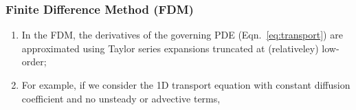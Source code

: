 \documentclass[10pt,compress,handout,ignorenonframetext]{beamer}
\begin{document}
\begin{frame}
 \frametitle{Finite Difference Method (FDM)} 

\begin{enumerate}
  \item <1-> In the FDM, the derivatives of the governing PDE (Eqn.~\ref{eq:transport}) are approximated using Taylor series expansions truncated at (relativeley) low-order;
  \item <2-> For example, if we consider the 1D transport equation with constant diffusion coefficient and no unsteady or advective terms,
\end{enumerate}  
 
\end{frame}
\end{document}
